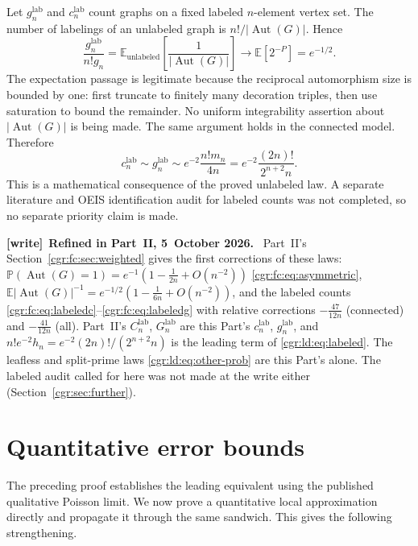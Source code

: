 \documentclass[11pt,letterpaper]{article}
\numberwithin{equation}{section}
\theoremstyle{definition}\newtheorem{definition}[theorem]{Definition}
\theoremstyle{remark}\newtheorem{remark}[theorem]{Remark}
\newcommand{\PP}{\mathbb P}
\newcommand{\EE}{\mathbb E}
\DeclareMathOperator{\Aut}{Aut}
\newenvironment{writenote}[1][]{\par\smallskip\begingroup\small
 \noindent\textbf{[write]}\if\relax\detokenize{#1}\relax\else~\textbf{#1.}\fi\ }%
 {\par\endgroup\smallskip}
\begin{document}
Let $g_n^{\mathrm{lab}}$ and $c_n^{\mathrm{lab}}$ count graphs
on a fixed labeled $n$-element vertex set. The number of labelings
of an unlabeled graph is $n!/|\Aut(G)|$. Hence
\begin{equation}\label{cgr:ld:eq:label-expectation}
 \frac{g_n^{\mathrm{lab}}}{n!g_n}
 =\EE_{\mathrm{unlabeled}}\left[\frac1{|\Aut(G)|}\right]
 \longrightarrow\EE[2^{-P}]=e^{-1/2}.
\end{equation}
The expectation passage is legitimate because the reciprocal
automorphism size is bounded by one: first truncate to finitely
many decoration triples, then use saturation to bound the
remainder. No uniform integrability assertion about $|\Aut(G)|$
is being made. The same argument holds in the connected model.
Therefore
\begin{equation}\label{cgr:ld:eq:labeled}
 c_n^{\mathrm{lab}}\sim g_n^{\mathrm{lab}}
 \sim e^{-2}\frac{n!m_n}{4n}
 =e^{-2}\frac{(2n)!}{2^{n+2}n}.
\end{equation}
This is a mathematical consequence of the proved unlabeled law.
A separate literature and OEIS identification audit for labeled
counts was not completed, so no separate priority claim is made.
\begin{writenote}[Refined in Part~II, 5~October 2026]
Part~II's Section~\ref{cgr:fc:sec:weighted} gives the first corrections of these laws: $\PP(\Aut(G)=1)=e^{-1}(1-\frac1{2n}+O(n^{-2}))$ \eqref{cgr:fc:eq:asymmetric}, $\EE|\Aut(G)|^{-1}=e^{-1/2}(1-\frac1{6n}+O(n^{-2}))$, and the labeled counts \eqref{cgr:fc:eq:labeledc}--\eqref{cgr:fc:eq:labeledg} with relative corrections $-\frac{47}{12n}$ (connected) and $-\frac{41}{12n}$ (all). Part~II's $C_n^{\mathrm{lab}}$, $G_n^{\mathrm{lab}}$ are this Part's $c_n^{\mathrm{lab}}$, $g_n^{\mathrm{lab}}$, and $n!e^{-2}h_n=e^{-2}(2n)!/(2^{n+2}n)$ is the leading term of \eqref{cgr:ld:eq:labeled}. The leafless and split-prime laws \eqref{cgr:ld:eq:other-prob} are this Part's alone. The labeled audit called for here was not made at the write either (Section~\ref{cgr:sec:further}).
\end{writenote}

\section{Quantitative error bounds}\label{cgr:ld:sec:quantitative}
The preceding proof establishes the leading equivalent using the
published qualitative Poisson limit. We now prove a quantitative
local approximation directly and propagate it through the same
sandwich. This gives the following strengthening.
\end{document}
